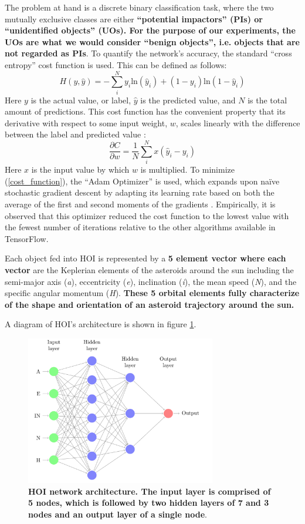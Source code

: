 \documentclass{aa}
\begin{document}
The problem at hand is a discrete binary classification task, where the two mutually exclusive classes are either \textbf{ ``potential impactors'' (PIs) or ``unidentified objects'' (UOs). For the purpose of our experiments, the UOs are what we would consider ``benign objects'', i.e. objects that are not regarded as PIs}. To quantify the network's accuracy, the standard ``cross entropy'' cost function is used. This can be defined as follows:
\begin{equation}
	\label{cost_function}
	H(y,\hat{y})=-\sum_i^{N} y_i \text{ln}(\hat{y}_i)+(1-y_i)\text{ln}(1-\hat{y}_i)
\end{equation}
Here $y$ is the actual value, or label, $\hat{y}$ is the predicted value, and $N$ is the total amount of predictions. This cost function has the convenient property that its derivative with respect to some input weight, $w$, scales linearly with the difference between the label and predicted value \citep{Nielson}:
\begin{equation}
	\frac{\partial C}{\partial w}=\frac{1}{N}\sum^{N}_i x(\hat{y}_i-y_i)
\end{equation}
Here $x$ is the input value by which $w$ is multiplied. To minimize (\ref{cost_function}), the ``Adam Optimizer'' is used, which expands upon na\"{i}ve stochastic gradient descent by adapting its learning rate based on both the average of the first and second moments of the gradients \citep{AdamOptimizer}. Empirically, it is observed that this optimizer reduced the cost function to the lowest value with the fewest number of iterations relative to the other algorithms available in TensorFlow. 
\par 
    Each object fed into HOI is represented by a \textbf{5 element vector where each vector} are the Keplerian elements of the asteroids around the sun including the semi-major axis (\textit{a}), eccentricity (\textit{e}), inclination (\textit{i}), the mean speed (\textit{N}), and the specific angular momentum (\textit{H}).
    \textbf{These 5 orbital elements fully characterize of the shape and orientation of an asteroid trajectory around the sun.}
\par 
A diagram of HOI's architecture is shown in figure \ref{FIG:HOI_Design}.
\begin{figure}[t]
    \hspace*{-0.4cm}
	\includegraphics[width=83mm]{images/1_network_hoi.png}
	\centering
	\caption{\label{FIG:HOI_Design} \textbf{HOI network architecture. The input layer is comprised of 5 nodes, which is followed by two hidden layers of 7 and 3 nodes and an output layer of a single node}.}
\end{figure}
\end{document}
